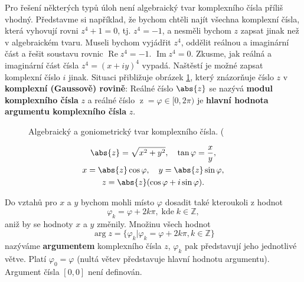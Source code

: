         
      
      Pro řešení některých typů úloh není algebraický tvar komplexního čísla příliš vhodný.
      Představme si například, že bychom chtěli najít všechna komplexní čísla, která vyhovují rovni
      \(z^4 + 1 = 0\), tj. \(z^4 = -1\), a nesměli bychom \(z\) zapsat jinak než v algebraickém
      tvaru. Museli bychom vyjádřit \(z^4\), oddělit reálnou a imaginární část a řešit soustavu
      rovnic \(\operatorname{Re}z^4 =-1\). \(\operatorname{Im}z^4 = 0\). Zkusme, jak reálná a
      imaginární část čísla \(z^4 = (x + iy)^4\) vypadá. Naštěstí je možné zapsat komplexní číslo
      \(i\) jinak. Situaci přibližuje obrázek \ref{mai:fig053}, který znázorňuje číslo \(z\) v
      \textbf{komplexní (Gaussově) rovině}: Reálné číslo \(\abs{z}\) se nazývá \textbf{modul
      komplexního čísla} \(z\) a reálné číslo \(\operatorname{z} = \varphi\in [0, 2\pi)\) je
      \textbf{hlavní hodnota argumentu komplexního čísla} \(z\). 
      
      \begin{figure}[ht!]  %
        \centering
        \caption{Algebraický a goniometrický tvar komplexního čísla. (\cite[s.~20]{Musilova2009MA1}}
        \label{mai:fig053}
      \end{figure}

      \begin{mdframed}[style=highlight]
        \begin{gather*}
          \abs{z} = \sqrt{x^2 + y^2}, \quad \tan\varphi = \dfrac{x}{y},    \\
          x = \abs{z}\cos\varphi, \quad y = \abs{z}\sin\varphi,            \\
          z = \abs{z}(\cos\varphi + i\sin\varphi).
        \end{gather*}
      \end{mdframed}
      Do vztahů pro \(x\) a \(y\) bychom mohli místo \(\varphi\) dosadit také kteroukoli z hodnot 
      \begin{equation*}
        \varphi_k = \varphi + 2k\pi,\; \text{kde}\;k\in\mathbb{Z}, 
      \end{equation*}
      aniž by se hodnoty \(x\) a \(y\) změnily. Množinu všech hodnot
      \begin{equation*}
        \arg{z} = \{\varphi_k\lvert\varphi_k = \varphi + 2k\pi, k\in\mathbb{Z}\}
      \end{equation*}
      nazýváme \textbf{argumentem} komplexního čísla \(z\), \(\varphi_k\) pak představují jeho 
      jednotlivé větve. Platí \(\varphi_0 = \varphi\) (nultá větev představuje hlavní hodnotu 
      argumentu). Argument čísla \([0, 0]\) není definován. 
        
